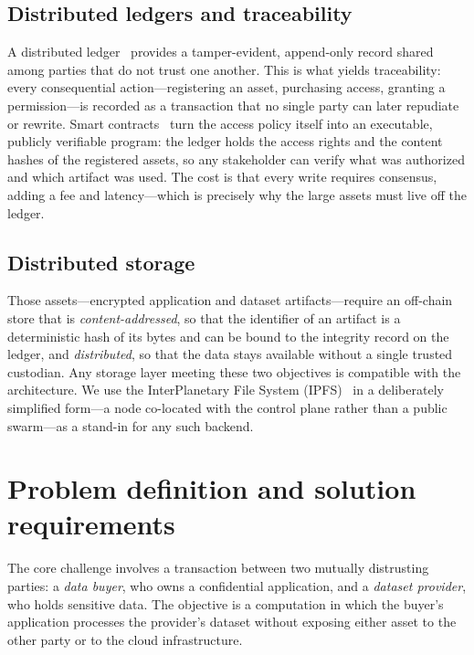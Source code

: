 \documentclass[runningheads]{llncs}
\begin{document}
\subsection{Distributed ledgers and traceability}
A distributed ledger~\cite{nakamoto2008bitcoin} provides a tamper-evident, append-only
record shared among parties that do not trust one another. This is what yields
traceability: every consequential action---registering an asset, purchasing access,
granting a permission---is recorded as a transaction that no single party can later
repudiate or rewrite. Smart contracts~\cite{buterin2014ethereum} turn the access policy
itself into an executable, publicly verifiable program: the ledger holds the access rights
and the content hashes of the registered assets, so any stakeholder can verify what was
authorized and which artifact was used. The cost is that every write requires consensus,
adding a fee and latency---which is precisely why the large assets must live off the ledger.

\subsection{Distributed storage}
Those assets---encrypted application and dataset artifacts---require an off-chain store
that is \emph{content-addressed}, so that the identifier of an artifact is a deterministic
hash of its bytes and can be bound to the integrity record on the ledger, and
\emph{distributed}, so that the data stays available without a single trusted custodian. Any
storage layer meeting these two objectives is compatible with the architecture. We use the
InterPlanetary File System (IPFS)~\cite{benet2014ipfs} in a deliberately simplified form---a
node co-located with the control plane rather than a public swarm---as a stand-in for any
such backend.



\section{Problem definition and solution requirements}
\label{sec:problem-definition}

The core challenge involves a transaction between two mutually distrusting parties: a
\textit{data buyer}, who owns a confidential application, and a \textit{dataset provider},
who holds sensitive data. The objective is a computation in which the buyer's application
processes the provider's dataset without exposing either asset to the other party or to the
cloud infrastructure.
\end{document}
